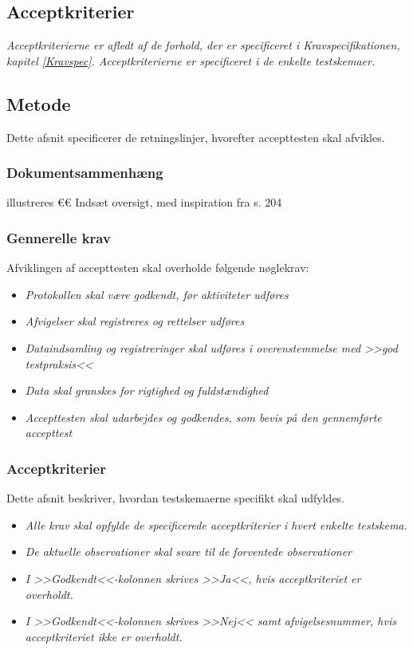 		\subsection{Acceptkriterier}
		\textit{Acceptkriterierne er afledt af de forhold, der er specificeret i Kravspecifikationen, kapitel \ref{Kravspec}. Acceptkriterierne er specificeret i de enkelte testskemaer.} 
		
		\subsection{Metode}
		Dette afsnit specificerer de retningslinjer, hvorefter accepttesten skal afvikles. 
		
			\subsubsection{Dokumentsammenhæng}
			illustreres 
			€€ Indsæt oversigt, med inspiration fra s. 204 	
			
			\subsubsection{Gennerelle krav}
			Afviklingen af accepttesten skal overholde følgende nøglekrav: 
			
			\begin{itemize}
				\item \textit{Protokollen skal være godkendt, før aktiviteter udføres}
				\item \textit{Afvigelser skal registreres og rettelser udføres}
				\item \textit{Dataindsamling og registreringer skal udføres i overenstemmelse med >>god testpraksis<< }
				\item \textit{Data skal granskes for rigtighed og fuldstændighed }
				\item \textit{Accepttesten skal udarbejdes og godkendes, som bevis på den gennemførte accepttest}
			\end{itemize}
			
			\subsubsection{Acceptkriterier}
			 Dette afsnit beskriver, hvordan testskemaerne specifikt skal udfyldes. 
			 
			 \begin{itemize}
				\item \textit{Alle krav skal opfylde de specificerede acceptkriterier i hvert enkelte testskema.}
				\item \textit{De aktuelle observationer skal svare til de forventede observationer}
				\item \textit{I >>Godkendt<<-kolonnen skrives >>Ja<<, hvis acceptkriteriet er overholdt.} 
				\item \textit{I >>Godkendt<<-kolonnen skrives >>Nej<< samt afvigelsesnummer, hvis acceptkriteriet ikke er overholdt.}  
			\end{itemize}
			
